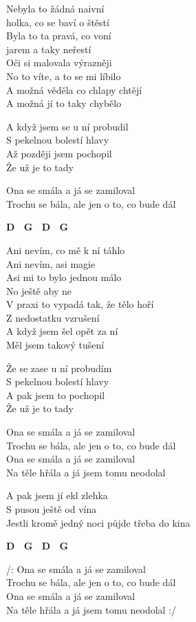 
\ve{}
Nebyla to žádná naivní\\
holka, co se baví o štěstí\\
Byla to ta pravá, co voní\\
jarem a taky neřestí\\
Oči si malovala výrazněji\\
No to víte, a to se mi líbilo\\
A možná věděla co chlapy chtějí\\
A možná jí to taky chybělo

\cho{}
A když jsem se u ní probudil\\
S pekelnou bolestí hlavy\\
Až později jsem pochopil\\
Že už je to tady

\re{*:}
Ona se smála a já se zamiloval\\
Trochu se bála, ale jen o to, co bude dál 

\re{}
\begin{footnotesize}
\textbf{D \ G \ D \ G}
\end{footnotesize}

\ve{}
Ani nevím, co mě k ní táhlo\\
Ani nevím, asi magie\\
Asi mi to bylo jednou málo\\
No ještě aby ne\\
V praxi to vypadá tak, že tělo hoří\\
Z nedostatku vzrušení\\
A když jsem šel opět za ní\\
Měl jsem takový tušení

\cho{}
Že se zase u ní probudím\\
S pekelnou bolestí hlavy\\
A pak jsem to pochopil\\
Že už je to tady

\re{*:}
Ona se smála a já se zamiloval\\
Trochu se bála, ale jen o to, co bude dál\\
Ona se smála a já se zamiloval\\
Na těle hřála a já jsem tomu neodolal 

\ve{}
A pak jsem jí ekl zlehka\\
S pusou ještě od vína\\
Jestli kromě jedný noci půjde třeba do kina 

\re{}
\begin{footnotesize}
\textbf{D \ G \ D \ G}
\end{footnotesize}

\re{*:}
/: Ona se smála a já se zamiloval\\
Trochu se bála, ale jen o to, co bude dál\\
Ona se smála a já se zamiloval\\
Na těle hřála a já jsem tomu neodolal :/

\esong{}